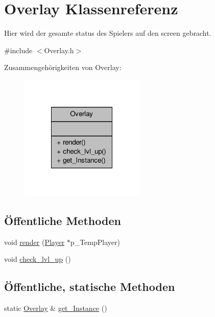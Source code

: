 \hypertarget{class_overlay}{\section{Overlay Klassenreferenz}
\label{class_overlay}
}


Hier wird der gesamte status des Spielers auf den screen gebracht.  




{\ttfamily \#include $<$Overlay.\-h$>$}



Zusammengehörigkeiten von Overlay\-:
\nopagebreak
\begin{figure}[H]
\begin{center}
\leavevmode
\includegraphics[width=168pt]{class_overlay__coll__graph}
\end{center}
\end{figure}
\subsection*{Öffentliche Methoden}
\begin{DoxyCompactItemize}
\item 
void \hyperlink{class_overlay_ab5e47eefa2743c08bc208131c8b17a45}{render} (\hyperlink{class_player}{Player} $\ast$p\-\_\-\-Temp\-Player)
\item 
void \hyperlink{class_overlay_a6e01bd776bf1daf819ced8e0e45b4478}{check\-\_\-lvl\-\_\-up} ()
\end{DoxyCompactItemize}
\subsection*{Öffentliche, statische Methoden}
\begin{DoxyCompactItemize}
\item 
static \hyperlink{class_overlay}{Overlay} \& \hyperlink{class_overlay_a6f0ea07b818fdc4ea2b00f1ed8169a6f}{get\-\_\-\-Instance} ()
\end{DoxyCompactItemize}


